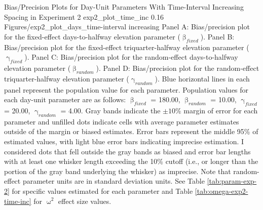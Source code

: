 \documentclass[
12pt, %
twoside,
english]{guelphthesis}
\newcommand{\setMainMatterLinespacing}{
 \setstretch{2} %

        \setstretch{2}
  }
\let\oldRestoreGeometry\restoregeometry
\renewcommand{\restoregeometry}{
  \oldRestoreGeometry

  \setMainMatterLinespacing
}
\begin{document}
\restoregeometry
\begin{apaFigure}
[portrait]
[samepage]
[-0.2cm]
{Bias/Precision Plots for Day-Unit Parameters With Time-Interval Increasing Spacing in Experiment 2}
{exp2_plot_time_inc}
{0.16}
{Figures/exp2_plot_days_time-interval increasing}
{Panel A: Bias/precision plot for the fixed-effect days-to-halfway elevation parameter ($\upbeta_{fixed}$). Panel B: Bias/precision plot for the fixed-effect triquarter-halfway elevation parameter ($\upgamma_{fixed}$). Panel C: Bias/precision plot for the random-effect days-to-halfway elevation parameter ($\upbeta_{random}$). Panel D: Bias/precision plot for the random-effect triquarter-halfway elevation parameter ($\upgamma_{random}$). Blue horizontal lines in each panel represent the population value for each parameter. Population values for each day-unit parameter are as follows: $\upbeta_{fixed}$ = 180.00, $\upbeta_{random}$ = 10.00, $\upgamma_{fixed}$ = 20.00, $\upgamma_{random}$ = 4.00. Gray bands indicate the $\pm 10\%$ margin of error for each parameter and unfilled dots indicate cells with average parameter estimates outside of the margin or biased estimates. Error bars represent the middle 95\% of estimated values, with light blue error bars indicating imprecise estimation. I considered dots that fell outside the gray bands as biased and error bar lengths with at least one whisker length exceeding the 10\% cutoff (i.e., or longer than the portion of the gray band underlying the whisker) as imprecise. Note that random-effect parameter units are in standard deviation units. See Table \ref{tab:param-exp-2} for specific values estimated for each parameter and Table \ref{tab:omega-exp2-time-inc} for $\upomega^2$ effect size values.}
\end{apaFigure}
\end{document}
